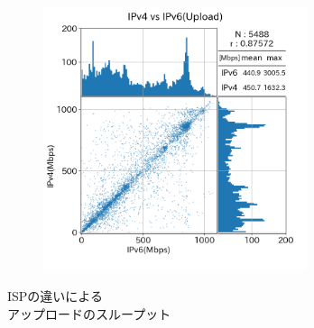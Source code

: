 \begin{figure}[htbp]
\begin{center}
\begin{minipage}[t]{0.48\textwidth}
\begin{center}
\begin{subfigure}[b]{\textwidth}
                \end{subfigure}
                \begin{subfigure}[b]{\textwidth}
                    \centering
                    \includegraphics[width=0.85\textwidth]{fig/new_Sony_ul.png}
                    \label{new_Sony_ul}
                \end{subfigure}
                \caption{ISPの違いによる\\アップロードのスループット}
                \label{fig:new_isp_ul2}
            \end{center}
        \end{minipage}
    \end{center}
\end{figure}
\FloatBarrier

